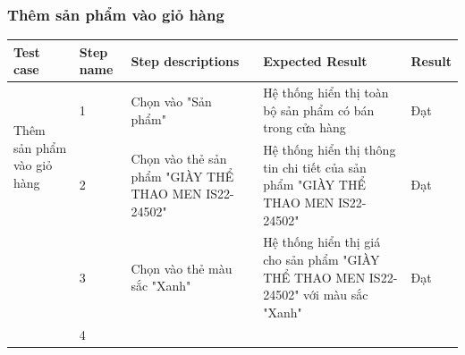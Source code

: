 \subsubsection{Thêm sản phẩm vào giỏ hàng}
{
    \setlength\extrarowheight{6pt}
    \begin{longtable}{| p{2.5cm}| p{1cm}| p{5.5cm}| p{4.5cm} | p{1.5cm} |}
        \hline
        \textbf{Test case}                                                                           & \textbf{Step name} & \textbf{Step descriptions} & \textbf{Expected Result} & \textbf{Result} \\
        \hline
        \multirow[t]{2}{2.5cm}{Thêm sản phẩm vào giỏ hàng}                                           &
        1                                                                                            &
        Chọn vào "Sản phẩm"                                                                          &
        Hệ thống hiển thị toàn bộ sản phẩm có bán trong cửa hàng                                     &
        Đạt                                                                                                                                                                                         \\
        \cline{2-5}
                                                                                                     & 2                  &
        Chọn vào thẻ sản phẩm "GIÀY THỂ THAO MEN IS22-24502"                                         &
        Hệ thống hiển thị thông tin chi tiết của sản phẩm "GIÀY THỂ THAO MEN IS22-24502"             &
        Đạt                                                                                                                                                                                         \\
        \cline{2-5}
                                                                                                     & 3                  &
        Chọn vào thẻ màu sắc "Xanh"                                                                  &
        Hệ thống hiển thị giá cho sản phẩm "GIÀY THỂ THAO MEN IS22-24502" với màu sắc "Xanh"         &
        Đạt                                                                                                                                                                                         \\
        \cline{2-5}
                                                                                                     & 4                  &

\end{longtable}}

